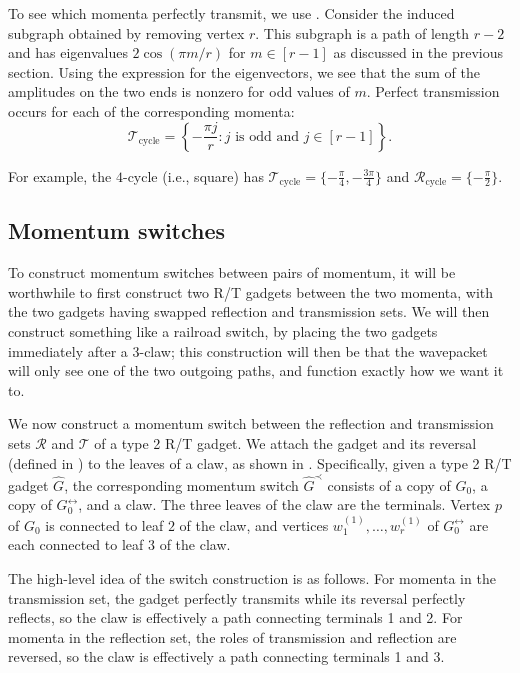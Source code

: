 \documentclass[../thesis-main/thesis-main]{subfiles}
\begin{document}
To see which momenta perfectly transmit, we use . Consider the induced subgraph obtained by removing vertex $r$. This subgraph is a path of length $r-2$ and has eigenvalues $2\cos(\pi m/r)$ for $m \in [r-1]$ as discussed in the previous section. Using the expression  for the eigenvectors, we see that the sum of the amplitudes on the two ends is nonzero for odd values of $m$.  Perfect transmission occurs for each of the corresponding momenta:  
\[
  \mathcal{T}_{\mathrm{cycle}} = \left\{ -\frac{\pi j}{r} \colon \text{$j$ is odd and $j\in [r-1]$}\right\}.
\]

For example, the $4$-cycle (i.e., square) has $\mathcal{T}_{\mathrm{cycle}} = \{-\frac{\pi}{4},-\frac{3\pi}{4}\}$ and $\mathcal{R}_{\mathrm{cycle}} = \{-\frac{\pi}{2}\}$.  



\subsection{Momentum switches}


To construct momentum switches between pairs of momentum, it will be worthwhile to first construct two R/T gadgets between the two momenta, with the two gadgets having swapped reflection and transmission sets.  We will then construct something like a railroad switch, by placing the two gadgets immediately after a 3-claw; this construction will then be that the wavepacket will only see one of the two outgoing paths, and function exactly how we want it to.


We now construct a momentum switch between the reflection and transmission sets $\mathcal{R}$ and $\mathcal{T}$ of a type 2 R/T gadget.  We attach the gadget and its reversal (defined in ) to the leaves of a claw, as shown in .  Specifically, given a type 2 R/T gadget $\hat{G}$, the corresponding momentum switch $\hat{G}^{\prec}$ consists of a copy of $G_0$, a copy of $G_{0}^{\leftrightarrow}$, and a claw.  The three leaves of the claw are the terminals.  Vertex $p$ of $G_0$ is connected to leaf $2$ of the claw, and vertices $w_1^{(1)},\ldots,w_r^{(1)}$ of $G_{0}^{\leftrightarrow}$ are each connected to leaf $3$ of the claw.

The high-level idea of the switch construction is as follows.  For momenta in the transmission set, the gadget perfectly transmits while its reversal perfectly reflects, so the claw is effectively a path connecting terminals 1 and 2.  For momenta in the reflection set, the roles of transmission and reflection are reversed, so the claw is effectively a path connecting terminals 1 and 3.
\end{document}
